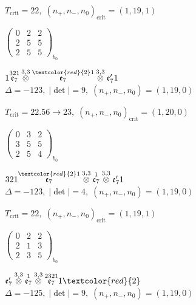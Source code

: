\documentclass[10pt]{article}
\begin{document}
\hspace{1em}$T_{\text{crit}}=22,\; (n_+,n_-,n_0)_{\text{crit}}=(1,19,1)$

\hspace{2em}$\left(\begin{smallmatrix}0 & 2 & 2 \\ 2 & 5 & 5 \\ 2 & 5 & 5\end{smallmatrix}\right)_{\!b_0}$

\smallskip

$1\overset{321}{\mathfrak{e}_7}\overset{3,3}{\otimes}\overset{\textcolor{red}{2}1}{\mathfrak{e}_7}\overset{3,3}{\otimes}\mathfrak{e}_7'1$ \quad $\Delta=-123,\; |\det|=9,\; (n_+,n_-,n_0)=(1,19,0)$

\hspace{1em}$T_{\text{crit}}=22.56 \to 23,\; (n_+,n_-,n_0)_{\text{crit}}=(1,20,0)$

\hspace{2em}$\left(\begin{smallmatrix}0 & 3 & 2 \\ 3 & 5 & 5 \\ 2 & 5 & 4\end{smallmatrix}\right)_{\!b_0}$

$321\overset{\textcolor{red}{2}1}{\mathfrak{e}_7}\overset{3,3}{\otimes}\overset{1}{\mathfrak{e}_7}\overset{3,3}{\otimes}\mathfrak{e}_7'1$ \quad $\Delta=-123,\; |\det|=4,\; (n_+,n_-,n_0)=(1,19,0)$

\hspace{1em}$T_{\text{crit}}=22,\; (n_+,n_-,n_0)_{\text{crit}}=(1,19,1)$

\hspace{2em}$\left(\begin{smallmatrix}0 & 2 & 2 \\ 2 & 1 & 3 \\ 2 & 3 & 5\end{smallmatrix}\right)_{\!b_0}$

\smallskip

$\mathfrak{e}_7'\overset{3,3}{\otimes}\overset{1}{\mathfrak{e}_7}\overset{3,3}{\otimes}\overset{2321}{\mathfrak{e}_7}1\textcolor{red}{2}$ \quad $\Delta=-125,\; |\det|=9,\; (n_+,n_-,n_0)=(1,19,0)$
\end{document}
